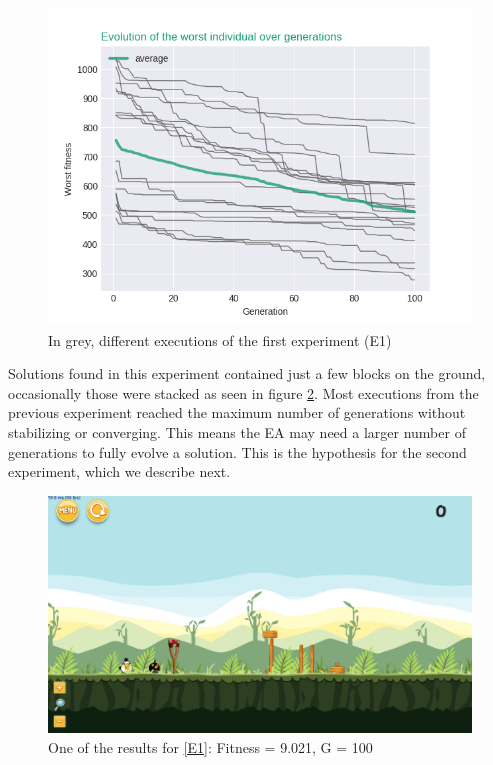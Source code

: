 \documentclass[a4paper,twoside]{article}
\begin{document}
\begin{figure}[h!tbp]
  \centering
  \includegraphics[scale=0.5]{exp1_worstIndv.png}
  \caption{In grey, different executions of the first experiment (E1)}\label{f:grahp1}
\end{figure}
%
Solutions found in this experiment contained just a few blocks on the ground,
occasionally those were stacked as seen in figure \ref{f:e1}.
Most executions from the previous experiment reached the maximum number of 
generations without stabilizing or converging. This means the EA may need a 
larger number of generations to fully evolve a solution. This is the hypothesis 
for the second experiment, which we describe next.
%
\begin{figure}
	\centering
	\includegraphics[scale=0.2]{level-0-180523_203106.png}
	\caption{One of the results for \ref{E1}: Fitness = 9.021, G = 100  }\label{f:e1}
\end{figure}
%
%
\end{document}
